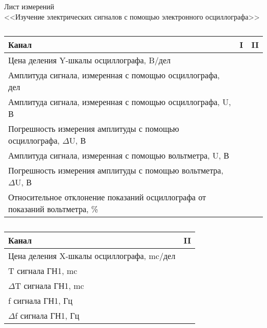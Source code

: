 \documentclass[a4paper,12pt]{article}
\begin{document}
	\newpage
	\pagestyle{fancy}
	
	\begin{center}
		{\Large Лист измерений}\\
		<<Изучение электрических сигналов с помощью электронного осциллографа>>
	\end{center}

\begin{table}[h]
	\caption{}
	\begin{tabularx}{\textwidth}{|X|X|X|}
		\hline 
		Канал & I & II \\ 
		\hline 
		Цена деления Y-шкалы осциллографа, B/дел &  &  \\ 
		\hline 
		Амплитуда сигнала, измеренная с помощью осциллографа, дел &  &  \\ 
		\hline 
		Амплитуда сигнала, измеренная с помощью осциллографа, U, В &  &  \\ 
		\hline 
		Погрешность измерения амплитуды с помощью осциллографа, $\Delta$U, В &  &  \\ 
		\hline 
		Амплитуда сигнала, измеренная с помощью вольтметра,  U, В &  &  \\ 
		\hline 
		Погрешность измерения амплитуды с помощью вольтметра, $\Delta$U, В &  &  \\ 
		\hline 
		Относительное отклонение показаний осциллографа от показаний вольтметра, \% &  &  \\ 
		\hline 
	\end{tabularx} 
\end{table}

\begin{table}[h]
	\caption{}
	\begin{tabularx}{\textwidth}{|X|X|}
		\hline 
		Канал & II \\ 
		\hline 
		Цена деления X-шкалы осциллографа, mc/дел &  \\ 
		\hline 
		T сигнала ГН1, mc &  \\ 
		\hline 
		$\Delta$T сигнала ГН1, mc &  \\ 
		\hline 
		f сигнала ГН1, Гц &  \\ 
		\hline 
		$\Delta$f сигнала ГН1, Гц &  \\ 
		\hline 
	\end{tabularx} 
\end{table}
\end{document}
